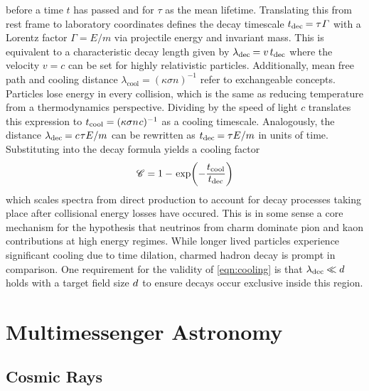 before a time $t$ has passed and for $\tau$ as the mean lifetime. Translating this from rest frame to laboratory coordinates defines
the decay timescale $t_\text{dec} \kern-0.6pt = \tau \kern+0.4pt \varGamma$ with a Lorentz factor $\varGamma = E / m$ via
projectile energy and invariant mass. This is equivalent to a characteristic decay length given by
$\lambda_\text{dec} \kern-0.5pt = v \kern+1.5pt t_\text{dec}$ where the velocity $v = c$ can be set for highly relativistic particles.
Additionally, mean free path and cooling distance $\lambda_\text{cool} = (\kappa\sigma n)^{-1}$ refer to exchangeable concepts. Particles
lose energy in every collision, which is the same as reducing temperature from a thermodynamics perspective. Dividing by the speed of
light $c$ translates this expression to $t_\text{cool} = (\kappa\sigma n \kern+0.5pt c)^{-1}$ as a cooling timescale. Analogously, the
distance $\lambda_\text{dec} \kern-0.5pt = c \kern+0.8pt \tau E / m$ can be rewritten as
$t_\text{dec} \kern-0.6pt = \tau E / m$ in units of time. Substituting into the decay formula yields a cooling factor
\begin{equation}
	\mathscr{C} = 1 - \kern+0.9pt \exp \biggl( -\frac{t_\text{cool}}{\raisebox{0.5ex}{$t_\text{dec}$}} \biggr)
	\label{eqn:cooling}
\end{equation}
which scales spectra from direct production to account for decay processes taking place after collisional energy losses have occured.
This is in some sense a core mechanism for the hypothesis that neutrinos from charm dominate pion and kaon contributions at high
energy regimes. While longer lived particles experience significant cooling due to time dilation, charmed hadron decay is prompt
in comparison. One requirement for the validity of \eqref{eqn:cooling} is that $\lambda_\text{dec} \kern-0.3pt \ll d \kern+0.5pt$
holds with a target field size $d \kern+0.5pt$ to ensure decays occur exclusive inside this region.



\section{Multimessenger Astronomy}
\label{sec:multimessenger}



\subsection{Cosmic Rays}
\label{sub:rays}



